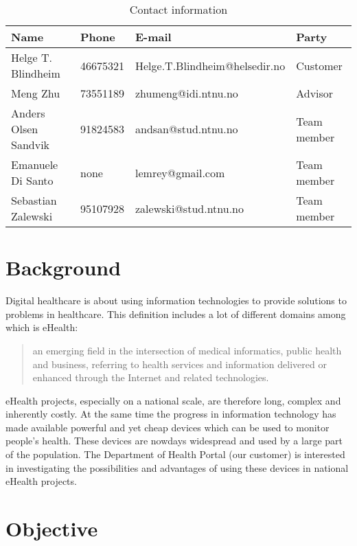 \begin{table}[h]
\begin{center}
\begin{tabular}{ | l | l | l | p{2.5cm} | }
  \hline
  Name & Phone & E-mail & Party \\
  \hline\noalign{\smallskip}\hline
  Helge T. Blindheim	& 46675321		& Helge.T.Blindheim@helsedir.no		& Customer\\
  Meng Zhu				& 73551189		& zhumeng@idi.ntnu.no				& Advisor\\
  Anders Olsen Sandvik	& 91824583		& andsan@stud.ntnu.no				& Team member \\
  Emanuele Di Santo		& none			& lemrey@gmail.com					& Team member \\
  Sebastian Zalewski	& 95107928		& zalewski@stud.ntnu.no				& Team member \\
  \hline
\end{tabular}
\end{center}
\caption{Contact information}
\label{table:contact}
\end{table}

\section{Background}
\label{section:background}

Digital healthcare is about using information technologies to provide solutions to problems in healthcare.
This definition includes a lot of different domains among which is eHealth:
\begin{quote}
an emerging field in the intersection of medical informatics, public health and business, referring to health services
and information delivered or enhanced through the Internet and related technologies.\citep{ehealth}
\end{quote}
eHealth projects, especially on a national scale, are therefore long, complex and inherently costly.
At the same time the progress in information technology has made available powerful and yet cheap devices which
can be used to monitor people's health. These devices are nowdays widespread and used by a large part of the
population. The Department of Health Portal (our customer) is interested in investigating the
possibilities and advantages of using these devices in national eHealth projects.


\section{Objective}
\label{section:objective}

